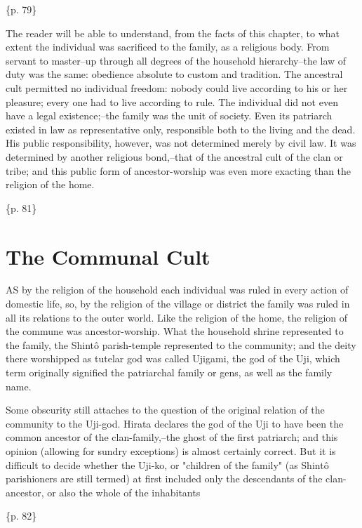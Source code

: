 \{p. 79\}

The reader will be able to understand, from the facts of this chapter, to what extent the individual was sacrificed to the family, as a religious body. From servant to master--up through all degrees of the household hierarchy--the law of duty was the same: obedience absolute to custom and tradition. The ancestral cult permitted no individual freedom: nobody could live according to his or her pleasure; every one had to live according to rule. The individual did not even have a legal existence;--the family was the unit of society. Even its patriarch existed in law as representative only, responsible both to the living and the dead. His public responsibility, however, was not determined merely by civil law. It was determined by another religious bond,--that of the ancestral cult of the clan or tribe; and this public form of ancestor-worship was even more exacting than the religion of the home.

\{p. 81\}

\section{The Communal Cult}
\label{sec:orgb4792de}

AS by the religion of the household each individual was ruled in every action of domestic life, so, by the religion of the village or district the family was ruled in all its relations to the outer world. Like the religion of the home, the religion of the commune was ancestor-worship. What the household shrine represented to the family, the Shintô parish-temple represented to the community; and the deity there worshipped as tutelar god was called Ujigami, the god of the Uji, which term originally signified the patriarchal family or gens, as well as the family name.



Some obscurity still attaches to the question of the original relation of the community to the Uji-god. Hirata declares the god of the Uji to have been the common ancestor of the clan-family,--the ghost of the first patriarch; and this opinion (allowing for sundry exceptions) is almost certainly correct. But it is difficult to decide whether the Uji-ko, or "children of the family" (as Shintô parishioners are still termed) at first included only the descendants of the clan-ancestor, or also the whole of the inhabitants

\{p. 82\}

